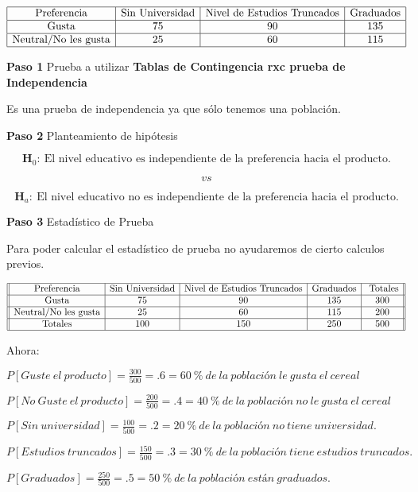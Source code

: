 \documentclass[
  a4paper,
  oneside,
  openany]{book}
\begin{document}
\[
\begin{array}{|c|c|c|c|} 
\hline
\mbox{Preferencia}& \mbox{Sin Universidad}&\mbox{Nivel de Estudios Truncados}&\mbox{Graduados}\\
\hline
\mbox{Gusta}& 75&90&135\\
\hline
\mbox{Neutral/No les gusta}& 25&60&115\\
\hline
\end {array}
\]

\textbf{Paso 1} Prueba a utilizar \textbf{Tablas de Contingencia rxc prueba de Independencia}

Es una prueba de independencia ya que sólo tenemos una población.

\textbf{Paso 2} Planteamiento de hipótesis

\[\textbf{H}_0: \ \mbox{El nivel educativo es independiente de la preferencia hacia el producto.}\]

\[vs\]

\[\textbf{H}_a:\ \mbox{El nivel educativo no es independiente de la preferencia hacia el producto.}\]

\textbf{Paso 3} Estadístico de Prueba

Para poder calcular el estadístico de prueba no ayudaremos de cierto calculos previos.

\[
\begin{array}{||c| c| c |c |c||} 
\hline 
\mbox{Preferencia}& \mbox{Sin Universidad}&\mbox{Nivel de Estudios Truncados}&\mbox{Graduados} &\mbox{ Totales} \\  
 \hline
\mbox{Gusta}&75&90&135&300\\
 \hline
\mbox{Neutral/No les gusta}&25&60&115&200\\
 \hline
\mbox{Totales}&100&150&250&500\\
 \hline
\end{array}
\]

Ahora:

\(P[Guste\ el\ producto]= \frac{300}{500}=.6= 60\ \%\ de\ la\ población\ le\ gusta\ el\ cereal\)

\(P[No\ Guste\ el\ producto]= \frac{200}{500}=.4= 40\ \%\ de\ la\ población\ no\ le\ gusta\ el\ cereal\)

\(P[Sin\ universidad]= \frac{100}{500}=.2= 20\ \%\ de\ la\ población\ no\ tiene\ universidad.\)

\(P[Estudios\ truncados]= \frac{150}{500}=.3= 30\ \%\ de\ la\ población\ tiene\ estudios\ truncados.\)

\(P[Graduados]= \frac{250}{500}=.5= 50\ \%\ de\ la\ población\ están\ graduados.\)
\end{document}
